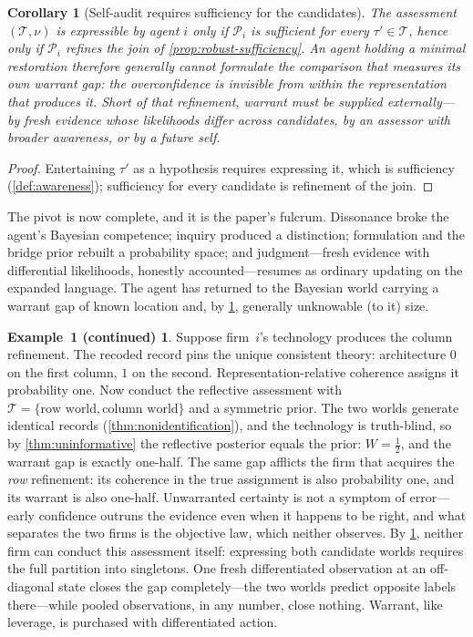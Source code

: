 \documentclass[11pt]{article}
\newtheorem{corollary}[assumption]{Corollary}
\theoremstyle{definition}
\newtheorem*{excont}{Example~1 (continued)}
\begin{document}
\begin{corollary}[Self-audit requires sufficiency for the candidates]
\label{cor:self-audit}
The assessment $(\mathcal T,\nu)$ is expressible by agent $i$ only if
$\mathcal P_i$ is sufficient for every $\tau'\in\mathcal T$, hence only if
$\mathcal P_i$ refines the join of \cref{prop:robust-sufficiency}.  An agent
holding a minimal restoration therefore generally cannot formulate the
comparison that measures its own warrant gap: the overconfidence is
invisible from within the representation that produces it.  Short of that
refinement, warrant must be supplied externally---by fresh evidence whose
likelihoods differ across candidates, by an assessor with broader awareness,
or by a future self.
\end{corollary}

\begin{proof}
Entertaining $\tau'$ as a hypothesis requires expressing it, which is
sufficiency (\cref{def:awareness}); sufficiency for every candidate is
refinement of the join.
\end{proof}

The pivot is now complete, and it is the paper's fulcrum.  Dissonance broke
the agent's Bayesian competence; inquiry produced a distinction; formulation
and the bridge prior rebuilt a probability space; and judgment---fresh
evidence with differential likelihoods, honestly accounted---resumes as
ordinary updating on the expanded language.  The agent has returned to the
Bayesian world carrying a warrant gap of known location and, by
\cref{cor:self-audit}, generally unknowable (to it) size.

\begin{excont}
Suppose firm~$i$'s technology produces the column refinement.  The recoded
record pins the unique consistent theory: architecture $0$ on the first
column, $1$ on the second.  Representation-relative coherence assigns it
probability one.  Now conduct the reflective assessment with
$\mathcal T=\{\text{row world},\text{column world}\}$ and a symmetric prior.
The two worlds generate identical records
(\cref{thm:nonidentification}), and the technology is truth-blind, so by
\cref{thm:uninformative} the reflective posterior equals the prior:
$W=\tfrac12$, and the warrant gap is exactly one-half.  The same gap
afflicts the firm that acquires the \emph{row} refinement: its coherence in
the true assignment is also probability one, and its warrant is also
one-half.  Unwarranted certainty is not a symptom of error---early
confidence outruns the evidence even when it happens to be right, and what
separates the two firms is the objective law, which neither observes.  By
\cref{cor:self-audit}, neither firm can conduct this assessment itself:
expressing both candidate worlds requires the full partition into
singletons.  One fresh differentiated observation at an off-diagonal state
closes the gap completely---the two worlds predict opposite labels
there---while pooled observations, in any number, close nothing.  Warrant,
like leverage, is purchased with differentiated action.
\end{excont}
\end{document}
